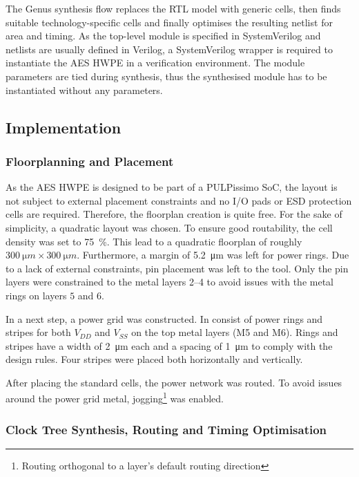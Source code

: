 \documentclass[a4paper, 12pt]{article}
\begin{document}
The Genus synthesis flow replaces the RTL model with generic cells, then finds suitable technology-specific cells and finally optimises the resulting netlist for area and timing. As the top-level module is specified in SystemVerilog and netlists are usually defined in Verilog, a SystemVerilog wrapper is required to instantiate the AES HWPE in a verification environment. The module parameters are tied during synthesis, thus the synthesised module has to be instantiated without any parameters.

\subsection{Implementation} \label{sec:asic:impl}

\subsubsection{Floorplanning and Placement}

As the AES HWPE is designed to be part of a PULPissimo SoC, the layout is not subject to external placement constraints and no I/O pads or ESD protection cells are required. Therefore, the floorplan creation is quite free. For the sake of simplicity, a quadratic layout was chosen. To ensure good routability, the cell density was set to \SI{75}{\percent}. This lead to a quadratic floorplan of roughly $\SI{300}{\micro m} \times \SI{300}{\micro m}$. Furthermore, a margin of \SI{5.2}{\micro m} was left for power rings. Due to a lack of external constraints, pin placement was left to the tool. Only the pin layers were constrained to the metal layers \numrange{2}{4} to avoid issues with the metal rings on layers $5$ and $6$.

In a next step, a power grid was constructed. In consist of power rings and stripes for both $V_{DD}$ and $V_{SS}$ on the top metal layers (M5 and M6). Rings and stripes have a width of \SI{2}{\micro m} each and a spacing of \SI{1}{\micro m} to comply with the design rules. Four stripes were placed both horizontally and vertically.

After placing the standard cells, the power network was routed. To avoid issues around the power grid metal, jogging\footnote{Routing orthogonal to a layer's default routing direction} was enabled.

\subsubsection{Clock Tree Synthesis, Routing and Timing Optimisation}
\end{document}

